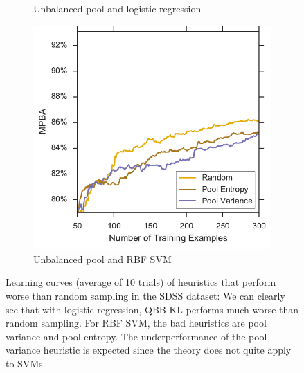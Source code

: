\begin{figure}[p]
\begin{subfigure}{.5\textwidth}
		\caption{Unbalanced pool and logistic regression}
		\label{fig:sdss_ul_ind_lower}
	\end{subfigure}%
	\begin{subfigure}{.5\textwidth}
		\centering
		\includegraphics[width=\linewidth]{figures/5_active/sdss_ur_ind_lower}
		\caption{Unbalanced pool and RBF SVM}
		\label{fig:sdss_ur_ind_lower}
	\end{subfigure}
	\caption[Learning curves of heuristics worse than random (SDSS)]{
		Learning curves (average of 10 trials) of heuristics that perform worse than random sampling in the SDSS dataset: We can clearly see that with logistic regression,
		QBB KL performs much worse than random sampling. For 
		RBF SVM, the bad heuristics are pool variance and pool entropy. The underperformance
		of the pool variance heuristic is expected since the theory does not quite apply
		to SVMs.}
	\label{fig:sdss_ind_lower}
\end{figure}


